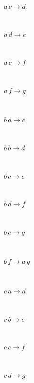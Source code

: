 \documentclass[rep10,leqno]{report}
\begin{document}
\begin{minipage}{6in}
$
a\,
 c\rightarrow d
$
\end{minipage}\medskip \\
\begin{minipage}{6in}
$
a\,
 d\rightarrow e
$
\end{minipage}\medskip \\
\begin{minipage}{6in}
$
a\,
 e\rightarrow f
$
\end{minipage}\medskip \\
\begin{minipage}{6in}
$
a\,
 f\rightarrow g
$
\end{minipage}\medskip \\
\begin{minipage}{6in}
$
b\,
 a\rightarrow c
$
\end{minipage}\medskip \\
\begin{minipage}{6in}
$
b\,
 b\rightarrow d
$
\end{minipage}\medskip \\
\begin{minipage}{6in}
$
b\,
 c\rightarrow e
$
\end{minipage}\medskip \\
\begin{minipage}{6in}
$
b\,
 d\rightarrow f
$
\end{minipage}\medskip \\
\begin{minipage}{6in}
$
b\,
 e\rightarrow g
$
\end{minipage}\medskip \\
\begin{minipage}{6in}
$
b\,
 f\rightarrow a\,
 g
$
\end{minipage}\medskip \\
\begin{minipage}{6in}
$
c\,
 a\rightarrow d
$
\end{minipage}\medskip \\
\begin{minipage}{6in}
$
c\,
 b\rightarrow e
$
\end{minipage}\medskip \\
\begin{minipage}{6in}
$
c\,
 c\rightarrow f
$
\end{minipage}\medskip \\
\begin{minipage}{6in}
$
c\,
 d\rightarrow g
$
\end{minipage}\medskip \\
\end{document}
